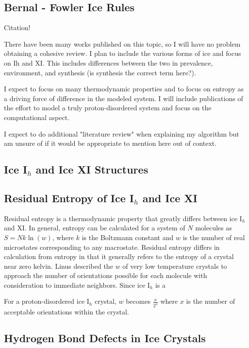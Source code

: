 \subsection{Bernal - Fowler Ice Rules}

Citation! \cite{BFIceOG}

There have been many works published on this topic, so I will have no problem obtaining a cohesive review. I plan to include the various forms of ice and focus on Ih and XI. This includes differences between the two in prevalence, environment, and synthesis (is synthesis the correct term here?). 

I expect to focus on many thermodynamic properties and to focus on entropy as a driving force of difference in the modeled system. I will include publications of the effort to model a truly proton-disordered system and focus on the computational aspect. 

I expect to do additional "literature review" when explaining my algorithm but am unsure of if it would be appropriate to mention here out of context.

\subsection{Ice I$_{h}$ and Ice XI Structures}

\subsection{Residual Entropy of Ice I$_{h}$ and Ice XI}

Residual entropy is a thermodynamic property that greatly differs between ice I$_{h}$ and XI. 
In general, entropy can be calculated for a system of $N$ molecules as $S = Nk\ln(w)$, where $k$ is the Boltzmann constant and $w$ is the number of real microstates corresponding to any macrostate.
Residual entropy differs in calculation from entropy in that it generally refers to the entropy of a crystal near zero kelvin. 
Linus \cite{PaulingIce} described the $w$ of very low temperature crystals to approach the number of orientations possible for each molecule with consideration to immediate neighbors. 
Since ice I$_{h}$ is a 

For a proton-disordered ice I$_{h}$ crystal, $w$ becomes $\frac{x}{2^{4}}$ where $x$ is the number of acceptable orientations within the crystal.

\subsection{Hydrogen Bond Defects in Ice Crystals}

